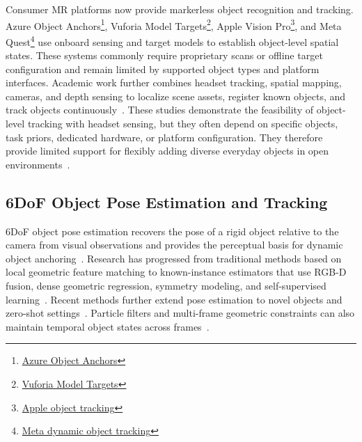 \documentclass[review]{vgtc}
\begin{document}
Consumer MR platforms now provide markerless object recognition and tracking. Azure Object Anchors\footnote{\href{https://learn.microsoft.com/en-us/dynamics365/mixed-reality/guides/pc-app-anchor-object}{Azure Object Anchors}}, Vuforia Model Targets\footnote{\href{https://developer.vuforia.com/library/vuforia-engine/images-and-objects/model-targets/model-targets/}{Vuforia Model Targets}}, Apple Vision Pro\footnote{\href{https://developer.apple.com/documentation/visionos/implementing-object-tracking-in-your-app}{Apple object tracking}}, and Meta Quest\footnote{\href{https://developers.meta.com/horizon/documentation/native/android/mobile-dynamic-object-tracker/}{Meta dynamic object tracking}} use onboard sensing and target models to establish object-level spatial states. These systems commonly require proprietary scans or offline target configuration and remain limited by supported object types and platform interfaces. Academic work further combines headset tracking, spatial mapping, cameras, and depth sensing to localize scene assets, register known objects, and track objects continuously~\cite{fan2021assettracking,doughty2022hmdegopose,pollabauer2023hololens,martingomez2024sttar,trojak2025mixedpose,greene2025markerless,trojak2026markerless,gbot2024}. These studies demonstrate the feasibility of object-level tracking with headset sensing, but they often depend on specific objects, task priors, dedicated hardware, or platform configuration. They therefore provide limited support for flexibly adding diverse everyday objects in open environments~\cite{hurt2025surrealitycv}.

\subsection{6DoF Object Pose Estimation and Tracking}

6DoF object pose estimation recovers the pose of a rigid object relative to the camera from visual observations and provides the perceptual basis for dynamic object anchoring~\cite{aguirrezabal2026survey}. Research has progressed from traditional methods based on local geometric feature matching to known-instance estimators that use RGB-D fusion, dense geometric regression, symmetry modeling, and self-supervised learning~\cite{densefusion2019,epos2020,gdrnet2021,self6d2020}. Recent methods further extend pose estimation to novel objects and zero-shot settings~\cite{gen6d2022,megapose2022,lin2024sam6d,ornek2024foundpose,moon2025coop,foundationpose2024}. Particle filters and multi-frame geometric constraints can also maintain temporal object states across frames~\cite{poserbpf2021,bundletrack2021}.
\end{document}

